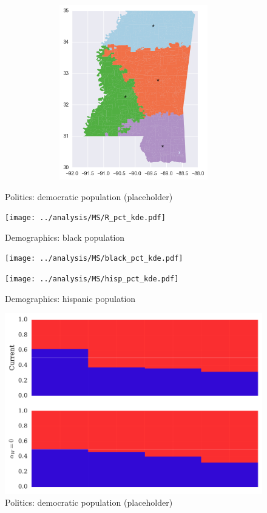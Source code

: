 \begin{figure}[htb!]
\includegraphics[width=5in,height=3in,keepaspectratio]{../maps/MS/static/0_25_after.png}
\end{figure}

\clearpage
\newpage

\begin{figure}[htb!] \centering
\caption{ Politics: democratic population (placeholder)}
\texttt{[image: ../analysis/MS/R\_pct\_kde.pdf]}
\caption{ Demographics: black population }
\texttt{[image: ../analysis/MS/black\_pct\_kde.pdf]}
\caption{ Demographics: hispanic population }
\texttt{[image: ../analysis/MS/hisp\_pct\_kde.pdf]}
\end{figure}

\clearpage
\newpage

\begin{figure}[htb!] \centering
\caption{ Politics: democratic population (placeholder)}
\includegraphics[width=6in]{../analysis/MS/barplot.pdf}
\end{figure}

